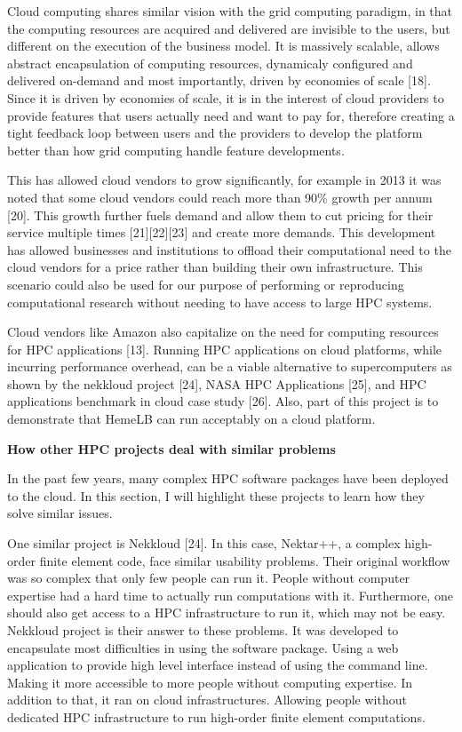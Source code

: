 \documentclass[]{article}
\begin{document}
Cloud computing shares similar vision with the grid computing paradigm,
in that the computing resources are acquired and delivered are invisible
to the users, but different on the execution of the business model. It
is massively scalable, allows abstract encapsulation of computing
resources, dynamicaly configured and delivered on-demand and most
importantly, driven by economies of scale {[}18{]}. Since it is driven
by economies of scale, it is in the interest of cloud providers to
provide features that users actually need and want to pay for, therefore
creating a tight feedback loop between users and the providers to
develop the platform better than how grid computing handle feature
developments.

This has allowed cloud vendors to grow significantly, for example in
2013 it was noted that some cloud vendors could reach more than 90\%
growth per annum {[}20{]}. This growth further fuels demand and allow
them to cut pricing for their service multiple times
{[}21{]}{[}22{]}{[}23{]} and create more demands. This development has
allowed businesses and institutions to offload their computational need
to the cloud vendors for a price rather than building their own
infrastructure. This scenario could also be used for our purpose of
performing or reproducing computational research without needing to have
access to large HPC systems.

Cloud vendors like Amazon also capitalize on the need for computing
resources for HPC applications {[}13{]}. Running HPC applications on
cloud platforms, while incurring performance overhead, can be a viable
alternative to supercomputers as shown by the nekkloud project {[}24{]},
NASA HPC Applications {[}25{]}, and HPC applications benchmark in cloud
case study {[}26{]}. Also, part of this project is to demonstrate that
HemeLB can run acceptably on a cloud platform.

\textbf{How other HPC projects deal with similar problems}

In the past few years, many complex HPC software packages have been
deployed to the cloud. In this section, I will highlight these projects
to learn how they solve similar issues.

One similar project is Nekkloud {[}24{]}. In this case, Nektar++, a
complex high-order finite element code, face similar usability problems.
Their original workflow was so complex that only few people can run it.
People without computer expertise had a hard time to actually run
computations with it. Furthermore, one should also get access to a HPC
infrastructure to run it, which may not be easy. Nekkloud project is
their answer to these problems. It was developed to encapsulate most
difficulties in using the software package. Using a web application to
provide high level interface instead of using the command line. Making
it more accessible to more people without computing expertise. In
addition to that, it ran on cloud infrastructures. Allowing people
without dedicated HPC infrastructure to run high-order finite element
computations.
\end{document}
